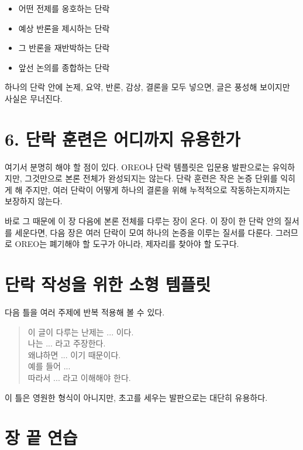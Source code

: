 \begin{itemize}
\tightlist
\item
  어떤 전제를 옹호하는 단락
\item
  예상 반론을 제시하는 단락
\item
  그 반론을 재반박하는 단락
\item
  앞선 논의를 종합하는 단락
\end{itemize}

하나의 단락 안에 논제, 요약, 반론, 감상, 결론을 모두 넣으면, 글은 풍성해 보이지만 사실은 무너진다.

\section{6. 단락 훈련은 어디까지 유용한가}\label{6-uxb2e8uxb77d-uxd6c8uxb828uxc740-uxc5b4uxb514uxae4cuxc9c0-uxc720uxc6a9uxd55cuxac00}

여기서 분명히 해야 할 점이 있다. OREO나 단락 템플릿은 입문용 발판으로는 유익하지만, 그것만으로 본론 전체가 완성되지는 않는다. 단락 훈련은 작은 논증 단위를 익히게 해 주지만, 여러 단락이 어떻게 하나의 결론을 위해 누적적으로 작동하는지까지는 보장하지 않는다.

바로 그 때문에 이 장 다음에 본론 전체를 다루는 장이 온다. 이 장이 한 단락 안의 질서를 세운다면, 다음 장은 여러 단락이 모여 하나의 논증을 이루는 질서를 다룬다. 그러므로 OREO는 폐기해야 할 도구가 아니라, 제자리를 찾아야 할 도구다.

\section{단락 작성을 위한 소형 템플릿}\label{uxb2e8uxb77d-uxc791uxc131uxc744-uxc704uxd55c-uxc18cuxd615-uxd15cuxd50cuxb9bf}

다음 틀을 여러 주제에 반복 적용해 볼 수 있다.

\begin{quote}
이 글이 다루는 난제는 ... 이다.\\
나는 ... 라고 주장한다.\\
왜냐하면 ... 이기 때문이다.\\
예를 들어 ...\\
따라서 ... 라고 이해해야 한다.
\end{quote}

이 틀은 영원한 형식이 아니지만, 초고를 세우는 발판으로는 대단히 유용하다.

\section{장 끝 연습}\label{uxc7a5-uxb05d-uxc5f0uxc2b5-3}

